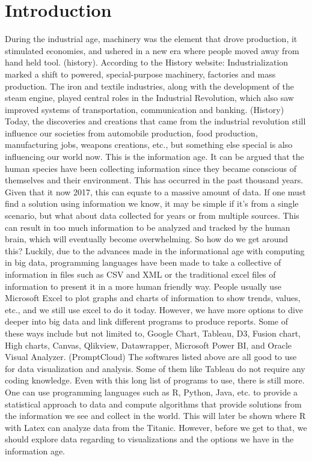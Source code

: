 \documentclass[sigconf]{acmart}
\begin{document}
\section{Introduction}
During the industrial age, machinery was the element that drove production, it stimulated economies, and ushered in a new era where people moved away from hand held tool. (history). According to the History website:
Industrialization marked a shift to powered, special-purpose machinery, factories and mass production. The iron and textile industries, along with the development of the steam engine, played central roles in the Industrial Revolution, which also saw improved systems of transportation, communication and banking. (History)
Today, the discoveries and creations that came from the industrial revolution still influence our societies from automobile production, food production, manufacturing jobs, weapons creations, etc., but something else special is also influencing our world now. This is the information age. It can be argued that the human species have been collecting information since they became conscious of themselves and their environment. This has occurred in the past thousand years. Given that it now 2017, this can equate to a massive amount of data. If one must find a solution using information we know, it may be simple if it’s from a single scenario, but what about data collected for years or from multiple sources. This can result in too much information to be analyzed and tracked by the human brain, which will eventually become overwhelming. So how do we get around this? Luckily, due to the advances made in the informational age with computing in big data, programming languages have been made to take a collective of information in files such as CSV and XML or the traditional excel files of information to present it in a more human friendly way.
People usually use Microsoft Excel to plot graphs and charts of information to show trends, values, etc., and we still use excel to do it today. However, we have more options to dive deeper into big data and link different programs to produce reports. Some of these ways include but not limited to, Google Chart, Tableau, D3, Fusion chart, High charts, Canvas, Qlikview, Datawrapper, Microsoft Power BI, and Oracle Visual Analyzer. (PromptCloud) The softwares listed above are all good to use for data visualization and analysis. Some of them like Tableau do not require any coding knowledge. Even with this long list of programs to use, there is still more. One can use programming languages such as R, Python, Java, etc. to provide a statistical approach to data and compute algorithms that provide solutions from the information we see and collect in the world. This will later be shown where R with Latex can analyze data from the Titanic. However, before we get to that, we should explore data regarding to visualizations and the options we have in the information age. 
\end{document}
